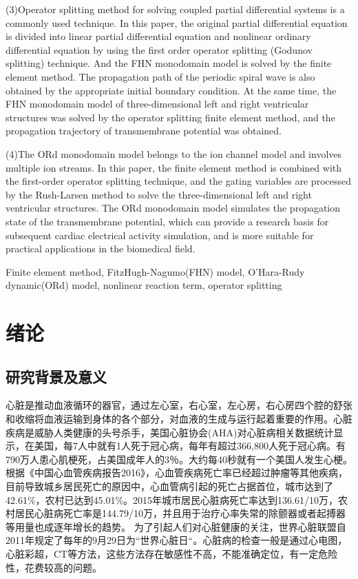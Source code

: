 \documentclass[twoside,UTF8]{nputhesis}
\begin{document}
\begin{Abstract}
(3)Operator splitting method for solving coupled partial differential systems is a commonly used technique. In this paper, the original partial differential equation is divided into
linear partial differential equation and nonlinear ordinary differential equation by using the first order operator splitting (Godunov splitting) technique. And the FHN monodomain model
is solved by the finite element method. The propagation path of the periodic spiral wave is also obtained by the appropriate initial boundary condition. At the same time, the FHN
monodomain model of three-dimensional left and right ventricular structures was solved by the operator splitting finite element method, and the propagation trajectory of transmembrane
potential was obtained.

(4)The ORd monodomain model belongs to the ion channel model and involves multiple ion streams. In this paper, the finite element method is combined with the first-order operator splitting technique, and the gating variables are processed by the Rush-Larsen method to solve the three-dimensional left and right ventricular structures. The ORd monodomain model simulates the propagation state of the transmembrane potential, which can provide a research basis for subsequent cardiac electrical activity simulation, and is more suitable for practical
applications in the biomedical field.
   
    \begin{Keywords}
      Finite element method, FitzHugh-Nagumo(FHN) model, O’Hara-Rudy dynamic(ORd) model, nonlinear reaction term, operator splitting
    \end{Keywords}
\end{Abstract}

\tableofcontents 

\mainmatter  
\chapter{绪论}
\section{研究背景及意义}
心脏是推动血液循环的器官，通过左心室，右心室，左心房，右心房四个腔的舒张和收缩将血液运输到身体的各个部分，对血液的生成与运行起着重要的作用。心脏疾病是威胁人类健康的头号杀手，美国心脏协会(AHA)对心脏病相关数据统计显示，在美国，每7人中就有1人死于冠心病，每年有超过366,800人死于冠心病。有790万人患心肌梗死，占美国成年人的3％。大约每40秒就有一个美国人发生心梗\cite{AHA2018}。
根据《中国心血管疾病报告2016》，心血管疾病死亡率已经超过肿瘤等其他疾病，目前导致城乡居民死亡的原因中，心血管病引起的死亡占据首位，城市达到了42.61\%，农村已达到45.01\%。2015年城市居民心脏病死亡率达到136.61/10万，农村居民心脏病死亡率是144.79/10万，并且用于治疗心率失常的除颤器或者起搏器等用量也成逐年增长的趋势\cite{china2016}。 为了引起人们对心脏健康的关注，世界心脏联盟自2011年规定了每年的9月29日为“世界心脏日“。心脏病的检查一般是通过心电图，心脏彩超，CT等方法，这些方法存在敏感性不高，不能准确定位，有一定危险性，花费较高的问题。
\end{document}
